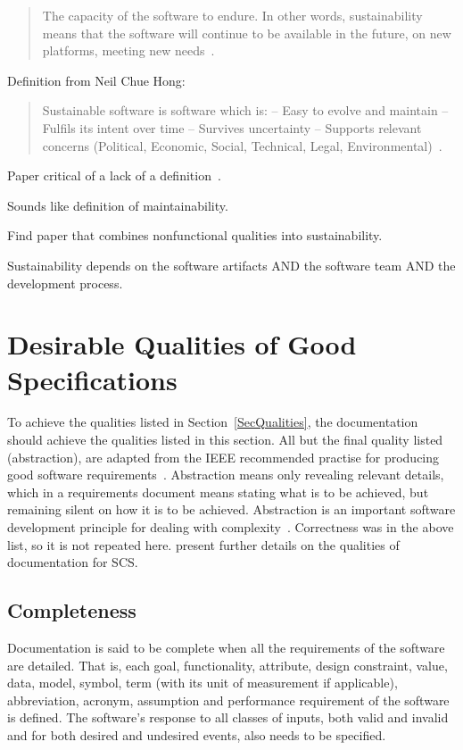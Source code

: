 \documentclass[12pt]{article}
\begin{document}
\begin{quotation}
  \noindent The capacity of the software to endure. In other words,
  sustainability means that the software will continue to be available in the
  future, on new platforms, meeting new needs~\cite{Katz2016}.
\end{quotation}

Definition from Neil Chue Hong:
\begin{quotation}
\noindent Sustainable software is software which is:
-- Easy to evolve and maintain
-- Fulfils its intent over time
-- Survives uncertainty
-- Supports relevant concerns (Political, Economic, Social, Technical,
Legal, Environmental)~\cite{Katz2016}.
\end{quotation}

Paper critical of a lack of a definition~\cite{VentersEtAl2014}.

Sounds like definition of maintainability.

Find paper that combines nonfunctional qualities into sustainability.

Sustainability depends on the software artifacts AND the software team AND the
development process.

\section{Desirable Qualities of Good Specifications} \label{SecDesirableQs}

To achieve the qualities listed in Section~\ref{SecQualities}, the documentation
should achieve the qualities listed in this section.  All but the final quality
listed (abstraction), are adapted from the IEEE recommended practise for
producing good software requirements~\cite{IEEE1998}.  Abstraction means only
revealing relevant details, which in a requirements document means stating what
is to be achieved, but remaining silent on how it is to be achieved.
Abstraction is an important software development principle for dealing with
complexity~\cite[p.~40]{GhezziEtAl2003}.  Correctness was in the above list, so
it is not repeated here.  \citet{SmithAndKoothoor2016} present further details
on the qualities of documentation for SCS.

\subsection{Completeness}

Documentation is said to be complete when all the requirements of the software
are detailed. That is, each goal, functionality, attribute, design constraint,
value, data, model, symbol, term (with its unit of measurement if applicable),
abbreviation, acronym, assumption and performance requirement of the software is
defined.  The software's response to all classes of inputs, both valid and
invalid and for both desired and undesired events, also needs to be specified.
\end{document}

